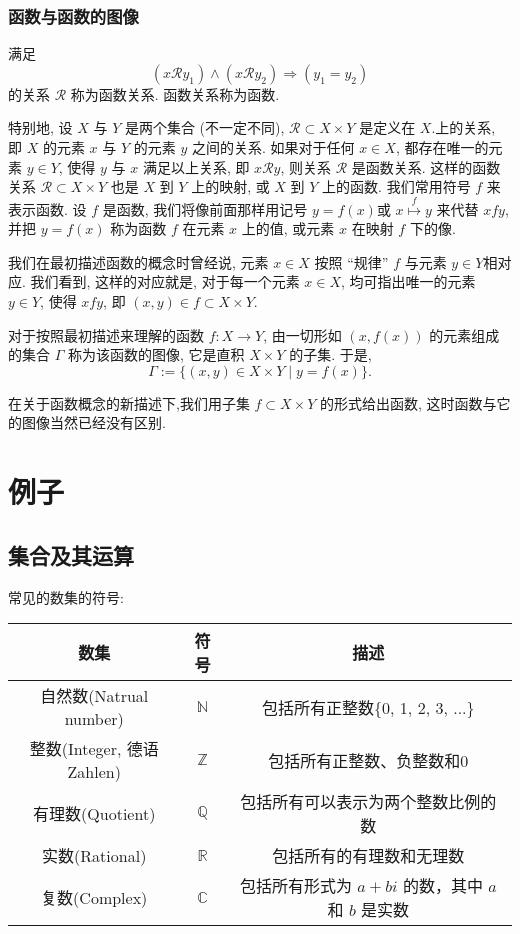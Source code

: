 \documentclass{ctexart}
\begin{document}
\subsubsection{函数与函数的图像} 满足
$$
\left(x \mathcal{R} y_1\right) \wedge\left(x \mathcal{R} y_2\right) \Rightarrow\left(y_1=y_2\right)
$$
的关系 $\mathcal{R}$ 称为函数关系.
函数关系称为函数.

特别地, 设 $X$ 与 $Y$ 是两个集合 (不一定不同), $\mathcal{R} \subset X \times Y$ 是定义在 $X$.上的关系, 即 $X$ 的元素 $x$ 与 $Y$ 的元素 $y$ 之间的关系. 如果对于任何 $x \in X$, 都存在唯一的元素 $y \in Y$, 使得 $y$ 与 $x$ 满足以上关系, 即 $x \mathcal{R} y$, 则关系 $\mathcal{R}$ 是函数关系.
这样的函数关系 $\mathcal{R} \subset X \times Y$ 也是 $X$ 到 $Y$ 上的映射, 或 $X$ 到 $Y$ 上的函数.
我们常用符号 $f$ 来表示函数. 设 $f$ 是函数, 我们将像前面那样用记号 $y=f(x)$或 $x \stackrel{f}{\longmapsto} y$ 来代替 $x f y$, 并把 $y=f(x)$ 称为函数 $f$ 在元素 $x$ 上的值, 或元素 $x$ 在映射 $f$ 下的像.

我们在最初描述函数的概念时曾经说, 元素 $x \in X$ 按照 “规律” $f$ 与元素 $y \in Y$相对应. 我们看到, 这样的对应就是, 对于每一个元素 $x \in X$, 均可指出唯一的元素 $y \in Y$, 使得 $x f y$, 即 $(x, y) \in f \subset X \times Y$.

对于按照最初描述来理解的函数 $f: X \rightarrow Y$, 由一切形如 $(x, f(x))$ 的元素组成的集合 $\Gamma$ 称为该函数的图像, 它是直积 $X \times Y$ 的子集. 于是,
$$
\Gamma:=\{(x, y) \in X \times Y \mid y=f(x)\} .
$$

在关于函数概念的新描述下,我们用子集 $f \subset X \times Y$ 的形式给出函数, 这时函数与它的图像当然已经没有区别.

\section{例子} 

\subsection{集合及其运算} 常见的数集的符号: 

\begin{tabular}{|c|c|c|}
    \hline
    \textbf{数集} & \textbf{符号} & \textbf{描述} \\
    \hline
    自然数(Natrual number) & $\mathbb{N}$ & 包括所有正整数\{0, 1, 2, 3, ...\} \\
    \hline
    整数(Integer, 德语Zahlen) & $\mathbb{Z}$ & 包括所有正整数、负整数和0 \\
    \hline
    有理数(Quotient) & $\mathbb{Q}$ & 包括所有可以表示为两个整数比例的数 \\
    \hline
    实数(Rational) & $\mathbb{R}$ & 包括所有的有理数和无理数 \\
    \hline
    复数(Complex) & $\mathbb{C}$ & 包括所有形式为 \(a + bi\) 的数，其中 \(a\) 和 \(b\) 是实数 \\
    \hline
    \end{tabular}
\end{document}
